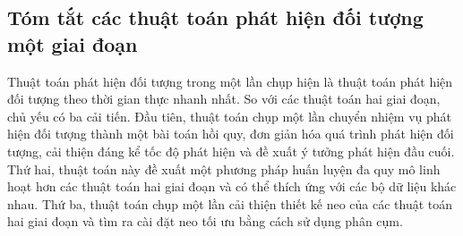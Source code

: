\documentclass[../the.tex]{subfiles}
\begin{document}

\subsection{Tóm tắt các thuật toán phát hiện đối tượng một giai đoạn}

{\fontsize{13}{12} \selectfont
	Thuật toán phát hiện đối tượng trong một lần chụp hiện là thuật toán phát hiện đối tượng theo thời gian thực nhanh nhất. So với các thuật toán hai giai đoạn, chủ yếu có ba cải tiến. Đầu tiên, thuật toán chụp một lần chuyển nhiệm vụ phát hiện đối tượng thành một bài toán hồi quy, đơn giản hóa quá trình phát hiện đối tượng, cải thiện đáng kể tốc độ phát hiện và đề xuất ý tưởng phát hiện đầu cuối. Thứ hai, thuật toán này đề xuất một phương pháp huấn luyện đa quy mô linh hoạt hơn các thuật toán hai giai đoạn và có thể thích ứng với các bộ dữ liệu khác nhau. Thứ ba, thuật toán chụp một lần cải thiện thiết kế neo của các thuật toán hai giai đoạn và tìm ra cài đặt neo tối ưu bằng cách sử dụng phân cụm.
}
\end{document}
